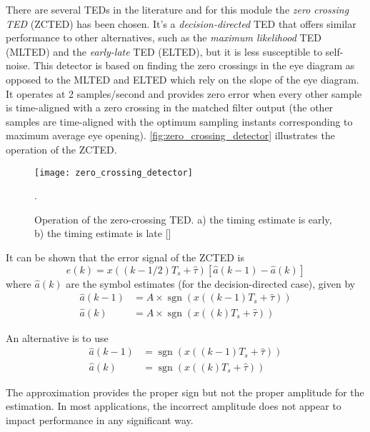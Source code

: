 There are several TEDs in the literature and for this module the \emph{zero crossing TED} (ZCTED) has been chosen. It's a \emph{decision-directed} TED that offers similar performance to other alternatives, such as the \emph{maximum likelihood} TED (MLTED) and the \emph{early-late} TED (ELTED), but it is less susceptible to self-noise. This detector is based on finding the zero crossings in the eye diagram as opposed to the MLTED and ELTED which rely on the slope of the eye diagram. It operates at 2 samples/second and provides zero error when every other sample is time-aligned with a zero crossing in the matched filter output (the other samples are time-aligned with the optimum sampling instants corresponding to maximum average eye opening). \autoref{fig:zero_crossing_detector} illustrates the operation of the ZCTED.

\begin{figure}[ht]
  \centering
  \texttt{[image: zero\_crossing\_detector]}
  \caption{Operation of the zero-crossing TED. a) the timing estimate is early, b) the timing estimate is late [\citeauthor{digcomm_discrete_approach}]}.
  \label{fig:zero_crossing_detector}
\end{figure}

It can be shown \cite{digcomm_discrete_approach} that the error signal of the ZCTED is
\begin{equation}
e(k) = x\left(\left(k-1/2\right)T_s+\hat\tau\right)\left[\hat a\left(k-1\right)-\hat a\left(k\right)\right]
\end{equation}
where $\hat a(k)$ are the symbol estimates (for the decision-directed case), given by
\begin{align}
\hat a(k-1) &= A\times\operatorname{sgn}\left(x\left(\left(k-1\right)T_s + \hat\tau\right)\right)\\
\hat a(k)   &= A\times\operatorname{sgn}\left(x\left(\left(k\right)T_s + \hat\tau\right)\right)
\end{align}

An alternative is to use
\begin{align}
\hat a(k-1) &= \operatorname{sgn}\left(x\left(\left(k-1\right)T_s + \hat\tau\right)\right)\\
\hat a(k)   &= \operatorname{sgn}\left(x\left(\left(k\right)T_s + \hat\tau\right)\right)
\end{align}

The approximation provides the proper sign but not the proper amplitude for the estimation. In most applications, the incorrect amplitude does not appear to impact performance in any significant way.

